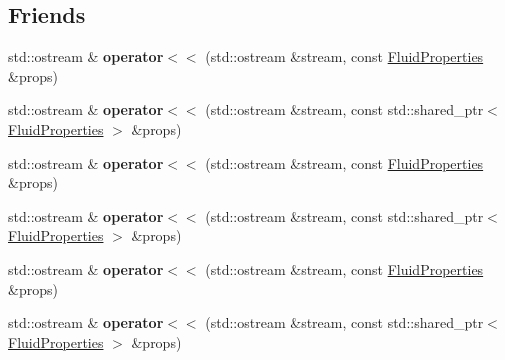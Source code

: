 \subsection*{Friends}
\begin{DoxyCompactItemize}
\item 
\mbox{\label{struct_steam_system_modeler_tool_1_1_fluid_properties_a0ae412b3e24ff0bd21899724bb826a6f}} 
std\+::ostream \& {\bfseries operator$<$$<$} (std\+::ostream \&stream, const \hyperlink{struct_steam_system_modeler_tool_1_1_fluid_properties}{Fluid\+Properties} \&props)
\item 
\mbox{\label{struct_steam_system_modeler_tool_1_1_fluid_properties_ae990ebdd211eee92ef71ff8890f1134b}} 
std\+::ostream \& {\bfseries operator$<$$<$} (std\+::ostream \&stream, const std\+::shared\+\_\+ptr$<$ \hyperlink{struct_steam_system_modeler_tool_1_1_fluid_properties}{Fluid\+Properties} $>$ \&props)
\item 
\mbox{\label{struct_steam_system_modeler_tool_1_1_fluid_properties_a0ae412b3e24ff0bd21899724bb826a6f}} 
std\+::ostream \& {\bfseries operator$<$$<$} (std\+::ostream \&stream, const \hyperlink{struct_steam_system_modeler_tool_1_1_fluid_properties}{Fluid\+Properties} \&props)
\item 
\mbox{\label{struct_steam_system_modeler_tool_1_1_fluid_properties_ae990ebdd211eee92ef71ff8890f1134b}} 
std\+::ostream \& {\bfseries operator$<$$<$} (std\+::ostream \&stream, const std\+::shared\+\_\+ptr$<$ \hyperlink{struct_steam_system_modeler_tool_1_1_fluid_properties}{Fluid\+Properties} $>$ \&props)
\item 
\mbox{\label{struct_steam_system_modeler_tool_1_1_fluid_properties_a0ae412b3e24ff0bd21899724bb826a6f}} 
std\+::ostream \& {\bfseries operator$<$$<$} (std\+::ostream \&stream, const \hyperlink{struct_steam_system_modeler_tool_1_1_fluid_properties}{Fluid\+Properties} \&props)
\item 
\mbox{\label{struct_steam_system_modeler_tool_1_1_fluid_properties_ae990ebdd211eee92ef71ff8890f1134b}} 
std\+::ostream \& {\bfseries operator$<$$<$} (std\+::ostream \&stream, const std\+::shared\+\_\+ptr$<$ \hyperlink{struct_steam_system_modeler_tool_1_1_fluid_properties}{Fluid\+Properties} $>$ \&props)
\end{DoxyCompactItemize}



